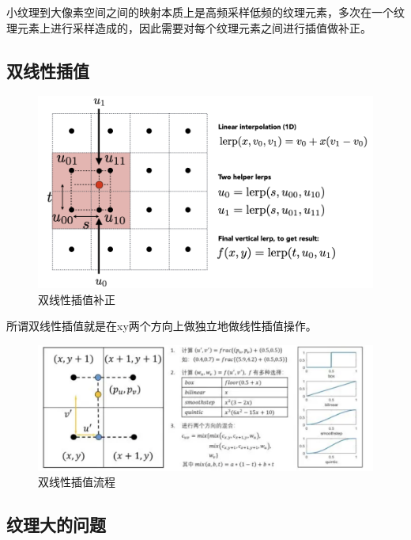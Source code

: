 小纹理到大像素空间之间的映射本质上是高频采样低频的纹理元素，多次在一个纹理元素上进行采样造成的，因此需要对每个纹理元素之间进行插值做补正。

\subsection*{双线性插值}

\begin{figure}[H]
    \centering
    \includegraphics[scale=0.4]{figures/双线性插值补正.png}
    \caption{双线性插值补正}
\end{figure}

所谓双线性插值就是在xy两个方向上做独立地做线性插值操作。

\begin{figure}[H]
    \centering
    \includegraphics[scale=0.3]{figures/双线性插值流程.png}
    \caption{双线性插值流程}
\end{figure}

\subsection*{纹理大的问题}

